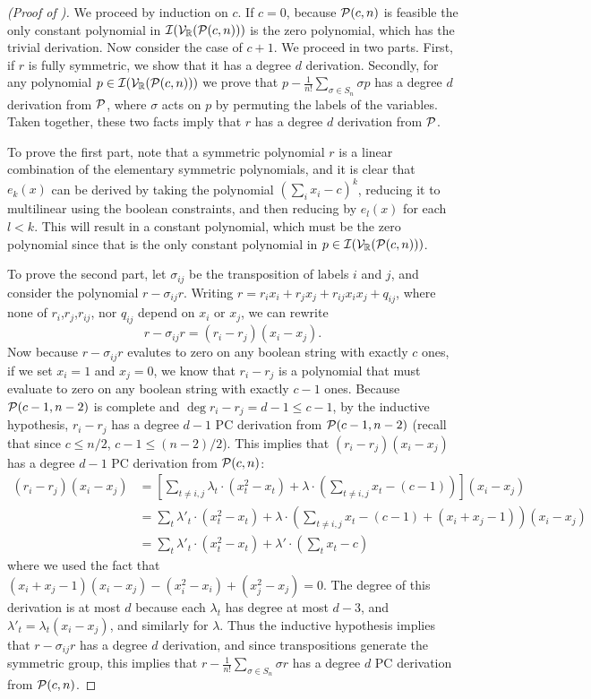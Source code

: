 \begin{proof}[(Proof of )]
We proceed by induction on $c$. If $c = 0$, because $\mathcal P(c,n)$ is feasible the only constant polynomial in $\mathcal I(\mathcal V_\mathbb R(\mathcal P(c,n)))$ is the zero polynomial, which has the trivial derivation. Now consider the case of $c+1$. We proceed in two parts. First, if $r$ is fully symmetric, we show that it has a degree $d$ derivation. Secondly, for any polynomial $p \in \mathcal I(\mathcal V_\mathbb R(\mathcal P(c,n)))$ we prove that $p - \frac{1}{n!}\sum_{\sigma \in S_n} \sigma p$ has a degree $d$ derivation from $\mathcal P$, where $\sigma$ acts on $p$ by permuting the labels of the variables. Taken together, these two facts imply that $r$ has a degree $d$ derivation from $\mathcal P$.

To prove the first part, note that a symmetric polynomial $r$ is a linear combination of the elementary symmetric polynomials, and it is clear that $e_k(x)$ can be derived by taking the polynomial $(\sum_i x_i - c)^k$, reducing it to multilinear using the boolean constraints, and then reducing by $e_l(x)$ for each $l < k$. This will result in a constant polynomial, which must be the zero polynomial since that is the only constant polynomial in $p \in \mathcal I(\mathcal V_\mathbb R(\mathcal P(c,n)))$. 

To prove the second part, let $\sigma_{ij}$ be the transposition of labels $i$ and $j$, and consider the polynomial $r - \sigma_{ij}r$. Writing $r = r_ix_i + r_jx_j + r_{ij}x_ix_j + q_{ij}$, where none of $r_i$,$r_j$,$r_{ij}$, nor $q_{ij}$ depend on $x_i$ or $x_j$, we can rewrite
\[r - \sigma_{ij}r = (r_i - r_j)(x_i - x_j).\]
Now because $r - \sigma_{ij}r$ evalutes to zero on any boolean string with exactly $c$ ones, if we set $x_i = 1$ and $x_j = 0$, we know that $r_i - r_j$ is a polynomial that must evaluate to zero on any boolean string with exactly $c-1$ ones. Because $\mathcal P(c-1,n-2)$ is complete and $\deg r_i - r_j = d-1 \leq c-1$, by the inductive hypothesis, $r_i - r_j$ has a degree $d-1$ PC derivation from $\mathcal P(c-1,n-2)$ (recall that since $c \leq n/2$, $c-1 \leq (n-2)/2$). This implies that $(r_i - r_j)(x_i - x_j)$ has a degree $d-1$ PC derivation from $\mathcal P(c,n)$:
\begin{align*}
(r_i - r_j)(x_i - x_j) &= \left[\sum_{t \neq i,j} \lambda_t\cdot (x_t^2 - x_t) + \lambda \cdot \left(\sum_{t \neq i,j} x_t - (c-1)\right)\right](x_i - x_j) \\
&= \sum_{t} \lambda'_t \cdot (x_t^2 - x_t) + \lambda \cdot \left(\sum_{t \neq i,j} x_t - (c-1) + (x_i + x_j - 1)\right)(x_i - x_j)\\
&= \sum_t \lambda'_t \cdot (x_t^2 - x_t) +\lambda' \cdot \left(\sum_t x_t - c\right)
\end{align*}
where we used the fact that $(x_i + x_j - 1)(x_i - x_j) - (x_i^2 - x_i) + (x_j^2 - x_j) = 0$. The degree of this derivation is at most $d$ because each $\lambda_t$ has degree at most $d-3$, and $\lambda'_t = \lambda_t(x_i - x_j)$, and similarly for $\lambda$. Thus the inductive hypothesis implies that $r - \sigma_{ij}r$ has a degree $d$ derivation, and since transpositions generate the symmetric group, this implies that $r - \frac{1}{n!}\sum_{\sigma \in S_n} \sigma r$ has a degree $d$ PC derivation from $\mathcal P(c,n)$.
\end{proof}

